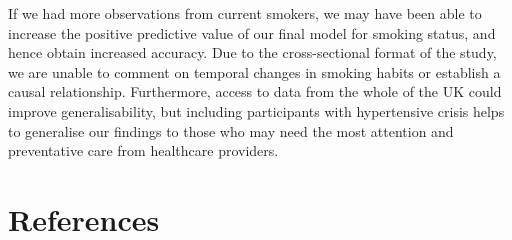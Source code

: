 \documentclass[
  11pt,
  twocolumn]{article}
\begin{document}
If we had more observations from current smokers, we may have been able
to increase the positive predictive value of our final model for smoking
status, and hence obtain increased accuracy. Due to the cross-sectional
format of the study, we are unable to comment on temporal changes in
smoking habits or establish a causal relationship. Furthermore, access
to data from the whole of the UK could improve generalisability, but
including participants with hypertensive crisis helps to generalise our
findings to those who may need the most attention and preventative care
from healthcare providers.

\clearpage
\onecolumn

\section*{References}\label{references}
\end{document}
